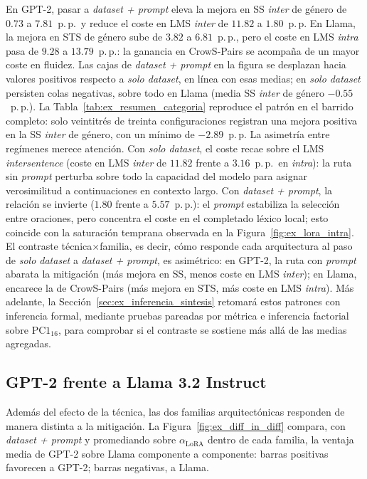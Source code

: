 \documentclass[12pt,a4paper]{report}
\newcommand{\aLoRA}{\ensuremath{\alpha_{\mathrm{LoRA}}}}
\newcommand{\PConeSixteen}{\ensuremath{\mathrm{PC1}_{16}}}
\begin{document}
\noindent
En GPT-2, pasar a \textit{dataset + prompt} eleva la mejora en SS \textit{inter} de género de $0.73$ a $7.81$~p.\,p.\ y reduce el coste en LMS \textit{inter} de $11.82$ a $1.80$~p.\,p. En Llama, la mejora en STS de género sube de $3.82$ a $6.81$~p.\,p., pero el coste en LMS \textit{intra} pasa de $9.28$ a $13.79$~p.\,p.: la ganancia en CrowS-Pairs se acompaña de un mayor coste en fluidez. Las cajas de \textit{dataset + prompt} en la figura se desplazan hacia valores positivos respecto a \textit{solo dataset}, en línea con esas medias; en \textit{solo dataset} persisten colas negativas, sobre todo en Llama (media SS \textit{inter} de género $-0.55$~p.\,p.). La Tabla~\ref{tab:ex_resumen_categoria} reproduce el patrón en el barrido completo: solo veintitrés de treinta configuraciones registran una mejora positiva en la SS \textit{inter} de género, con un mínimo de $-2.89$~p.\,p. La asimetría entre regímenes merece atención. Con \textit{solo dataset}, el coste recae sobre el LMS \textit{intersentence} (coste en LMS \textit{inter} de $11.82$ frente a $3.16$~p.\,p.\ en \textit{intra}): la ruta sin \textit{prompt} perturba sobre todo la capacidad del modelo para asignar verosimilitud a continuaciones en contexto largo. Con \textit{dataset + prompt}, la relación se invierte ($1.80$ frente a $5.57$~p.\,p.): el \textit{prompt} estabiliza la selección entre oraciones, pero concentra el coste en el completado léxico local; esto coincide con la saturación temprana observada en la Figura~\ref{fig:ex_lora_intra}. El contraste técnica$\times$familia, es decir, cómo responde cada arquitectura al paso de \textit{solo dataset} a \textit{dataset + prompt}, es asimétrico: en GPT-2, la ruta con \textit{prompt} abarata la mitigación (más mejora en SS, menos coste en LMS \textit{inter}); en Llama, encarece la de CrowS-Pairs (más mejora en STS, más coste en LMS \textit{intra}). Más adelante, la Sección~\ref{sec:ex_inferencia_sintesis} retomará estos patrones con inferencia formal, mediante pruebas pareadas por métrica e inferencia factorial sobre \PConeSixteen{}, para comprobar si el contraste se sostiene más allá de las medias agregadas.

\FloatBarrier
\subsection{GPT-2 frente a Llama 3.2 Instruct}
\label{subsec:ex_familia_compare}

Además del efecto de la técnica, las dos familias arquitectónicas responden de manera distinta a la mitigación. La Figura~\ref{fig:ex_diff_in_diff} compara, con \textit{dataset + prompt} y promediando sobre \aLoRA{} dentro de cada familia, la ventaja media de GPT-2 sobre Llama componente a componente: barras positivas favorecen a GPT-2; barras negativas, a Llama.
\end{document}

